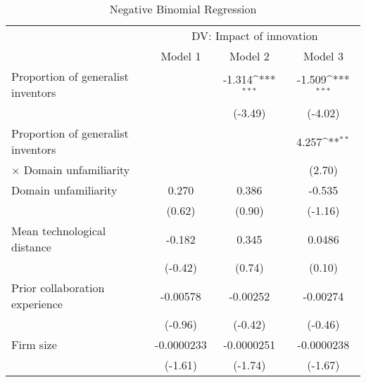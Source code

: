 {
    \def\sym#1{\ifmmode^{#1}\else\(^{#1}\)\fi}
    \begin{singlespace}
    \begin{table}
        \centering
\caption{Negative Binomial Regression} \label{nb}
    \begin{tabular}{l*{3}{c}}
\toprule
&\multicolumn{3}{c}{DV: Impact of innovation}\\
\cmidrule(lr){2-4}
&\multicolumn{1}{c}{Model 1}&\multicolumn{1}{c}{Model 2}&\multicolumn{1}{c}{Model 3}\\
\midrule
Proportion of generalist inventors  &                     &      -1.314\sym{***}&      -1.509\sym{***}\\
&                     &     (-3.49)         &     (-4.02)         \\
\addlinespace
Proportion of generalist inventors&                     &                     &       4.257\sym{**} \\
$\times$ Domain unfamiliarity&                     &                     &      (2.70)         \\
\addlinespace
Domain unfamiliarity&       0.270         &       0.386         &      -0.535         \\
&      (0.62)         &      (0.90)         &     (-1.16)         \\
\addlinespace
Mean technological distance    &      -0.182         &       0.345         &      0.0486         \\
&     (-0.42)         &      (0.74)         &      (0.10)         \\
\addlinespace
Prior collaboration experience      &    -0.00578         &    -0.00252         &    -0.00274         \\
&     (-0.96)         &     (-0.42)         &     (-0.46)         \\
\addlinespace
Firm size        &  -0.0000233         &  -0.0000251         &  -0.0000238         \\
&     (-1.61)         &     (-1.74)         &     (-1.67)         \\

\end{tabular}
\end{table}
\end{singlespace}}
